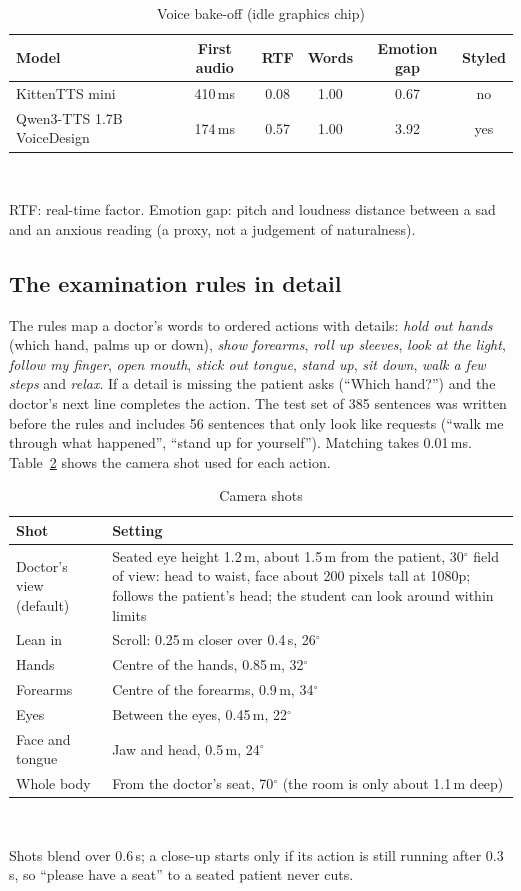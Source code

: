 \documentclass{article}
\begin{document}
\begin{table}[t]
\caption{Voice bake-off (idle graphics chip)}
\label{tab:tts}
\centering
\scriptsize

\begin{tabular}{@{}lccccc@{}}
\toprule
Model & First audio & RTF & Words & Emotion gap & Styled\\
\midrule
KittenTTS mini & 410\,ms & 0.08 & 1.00 & 0.67 & no\\
Qwen3-TTS 1.7B VoiceDesign & 174\,ms & 0.57 & 1.00 & 3.92 & yes\\
\bottomrule
\end{tabular}
\\[1mm]\raggedright\scriptsize RTF: real-time factor. Emotion gap: pitch and loudness distance between a sad and an anxious reading (a proxy, not a
judgement of naturalness).
\end{table}

\subsection{The examination rules in detail}
The rules map a doctor's words to ordered actions with details: \emph{hold out hands} (which hand, palms up or down), \emph{show forearms},
\emph{roll up sleeves}, \emph{look at the light}, \emph{follow my finger}, \emph{open mouth}, \emph{stick out tongue}, \emph{stand up},
\emph{sit down}, \emph{walk a few steps} and \emph{relax}. If a detail is missing the patient asks (``Which hand?'') and the doctor's next line
completes the action. The test set of 385 sentences was written before the rules and includes 56 sentences that only look like requests (``walk
me through what happened'', ``stand up for yourself''). Matching takes 0.01\,ms. Table~\ref{tab:cam} shows the camera shot used for each action.

\begin{table}[t]
\caption{Camera shots}
\label{tab:cam}
\centering
\scriptsize
\begin{tabular}{ll}
\toprule
Shot & Setting\\
\midrule
Doctor's view (default) & Seated eye height 1.2\,m, about 1.5\,m from the patient, 30$^\circ$ field of view: head to waist, face about 200
pixels tall at 1080p; follows the patient's head; the student can look around within limits\\
Lean in & Scroll: 0.25\,m closer over 0.4\,s, 26$^\circ$\\
Hands & Centre of the hands, 0.85\,m, 32$^\circ$\\
Forearms & Centre of the forearms, 0.9\,m, 34$^\circ$\\
Eyes & Between the eyes, 0.45\,m, 22$^\circ$\\
Face and tongue & Jaw and head, 0.5\,m, 24$^\circ$\\
Whole body & From the doctor's seat, 70$^\circ$ (the room is only about 1.1\,m deep)\\
\bottomrule
\end{tabular}
\\[1mm]\raggedright\scriptsize Shots blend over 0.6\,s; a close-up starts only if its action is still running after 0.3\,s, so ``please have a seat''
to a seated patient never cuts.
\end{table}
\end{document}
